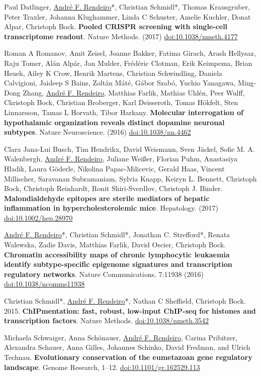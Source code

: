 \documentclass[11pt,a4paper,roman]{moderncv} %
\begin{document}
\begin{etaremune}[leftmargin=2.5cm,itemindent=0pt,topsep=10pt,itemsep=2pt,partopsep=0pt,parsep=0pt]
        \item Paul Datlinger, \underline{André F. Rendeiro}*, Christian Schmidl*, Thomas Krausgruber, Peter Traxler, Johanna Klughammer, Linda C Schuster, Amelie Kuchler, Donat Alpar, Christoph Bock. \textbf{Pooled CRISPR screening with single-cell transcriptome readout}. Nature Methods. (2017) \href{https://dx.doi.org/10.1038/nmeth.4177}{doi:10.1038/nmeth.4177}
        \item Roman A Romanov, Amit Zeisel, Joanne Bakker, Fatima Girach, Arash Hellysaz, Raju Tomer, Alán Alpár, Jan Mulder, Frédéric Clotman, Erik Keimpema, Brian Hsueh, Ailey K Crow, Henrik Martens, Christian Schwindling, Daniela Calvigioni, Jaideep S Bains, Zoltán Máté, Gábor Szabó, Yuchio Yanagawa, Ming-Dong Zhang, \underline{André F. Rendeiro}, Matthias Farlik, Mathias Uhlén, Peer Wulff, Christoph Bock, Christian Broberger, Karl Deisseroth, Tomas Hökfelt, Sten Linnarsson, Tamas L Horvath, Tibor Harkany. \textbf{Molecular interrogation of hypothalamic organization reveals distinct dopamine neuronal subtypes}. Nature Neuroscience. (2016) \href{https://dx.doi.org/10.1038/nn.4462}{doi:10.1038/nn.4462}
        \item Clara Jana-Lui Busch, Tim Hendrikx, David Weismann, Sven Jäckel, Sofie M. A. Walenbergh, \underline{André F. Rendeiro}, Juliane Weißer, Florian Puhm, Anastasiya Hladik, Laura Göderle, Nikolina Papac-Milicevic, Gerald Haas, Vincent Millischer, Saravanan Subramaniam, Sylvia Knapp, Keiryn L. Bennett, Christoph Bock, Christoph Reinhardt, Ronit Shiri-Sverdlov, Christoph J. Binder. \textbf{Malondialdehyde epitopes are sterile mediators of hepatic inflammation in hypercholesterolemic mice}. Hepatology. (2017) \href{https://dx.doi.org/10.1002/hep.28970}{doi:10.1002/hep.28970}
        \item \underline{André F. Rendeiro}*, Christian Schmidl*, Jonathan C. Strefford*, Renata Walewska, Zadie Davis, Matthias Farlik, David Oscier, Christoph Bock. \textbf{Chromatin accessibility maps of chronic lymphocytic leukaemia identify subtype-specific epigenome signatures and transcription regulatory networks}. Nature Communications. 7:11938 (2016) \href{https://dx.doi.org/10.1038/ncomms11938}{doi:10.1038/ncomms11938}
        \item Christian Schmidl*, \underline{André F. Rendeiro}*,  Nathan C Sheffield, Christoph Bock. 2015. \textbf{ChIPmentation: fast, robust, low-input ChIP-seq for histones and transcription factors}. Nature Methods. \href{https://dx.doi.org/10.1038/nmeth.3542}{doi:10.1038/nmeth.3542}
        \item Michaela Schwaiger, Anna Schönauer, \underline{André F. Rendeiro}, Carina Pribitzer, Alexandra Schauer, Anna Gilles, Johannes Schinko, David Fredman, and Ulrich Technau. \textbf{Evolutionary conservation of the eumetazoan gene regulatory landscape}. Genome Research, 1–12. \href{https://dx.doi.org/10.1101/gr.162529.113}{doi:10.1101/gr.162529.113}
        \end{etaremune}
\end{document}
